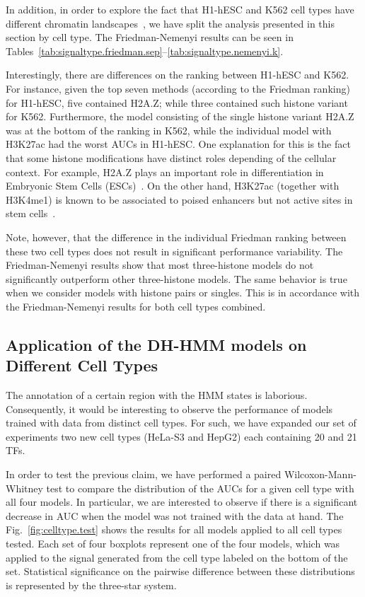 \documentclass{bioinfo}
\begin{document}
{\color{black}
In addition, in order to explore the fact that H1-hESC and K562 cell types have
different chromatin landscapes~\citep{dewit2013}, we have split the analysis presented
in this section by cell type. The Friedman-Nemenyi results can be seen in 
Tables~\ref{tab:signaltype.friedman.sep}--\ref{tab:signaltype.nemenyi.k}.

Interestingly, there are differences on the ranking between
H1-hESC and K562. For instance, given the top seven methods (according to the Friedman ranking)
for H1-hESC, five contained H2A.Z; while three contained such histone variant for K562. Furthermore,
the model consisting of the single histone variant H2A.Z was at the bottom of the ranking in K562, while
the individual model with H3K27ac had the worst AUCs in H1-hESC.
One explanation for this is the fact that some histone modifications have distinct
roles depending of the cellular context. For example, H2A.Z plays an important role in
differentiation in Embryonic Stem Cells (ESCs)~\cite{subramanian2013,hu2012}.
On the other hand, H3K27ac (together with H3K4me1) is known to be associated to
poised enhancers but not active sites in stem cells~\cite{rada2010}.

Note, however, that the difference in the individual Friedman ranking between these two
cell types does not result in significant performance variability. The Friedman-Nemenyi
results show that most three-histone models do not significantly outperform other three-histone models.
The same behavior is true when we consider models with histone pairs or singles. This is
in accordance with the Friedman-Nemenyi results for both cell types combined.
}

\subsection{Application of the DH-HMM models on Different Cell Types}
\label{sec:hmm.cell.test}

The annotation of a certain region with the HMM states is laborious. Consequently, it would be interesting to observe the performance
of models trained with data from distinct cell types.  For such, we have expanded
our set of experiments two new cell types (HeLa-S3 and HepG2) each containing 20 and 21 TFs.

In order to test the previous claim, we have performed a paired Wilcoxon-Mann-Whitney test
to compare the distribution of the AUCs for a given cell type with all four models. In particular,
we are interested to observe if there is a significant decrease in AUC when the model
was not trained with the data at hand. The Fig.~\ref{fig:celltype.test} shows the
results for all models applied to all cell types tested. Each set of four
boxplots represent one of the four models, which was applied to the signal
generated from the cell type labeled on the bottom of the set. Statistical significance
on the pairwise difference between these distributions is represented by the
three-star system.
\end{document}
